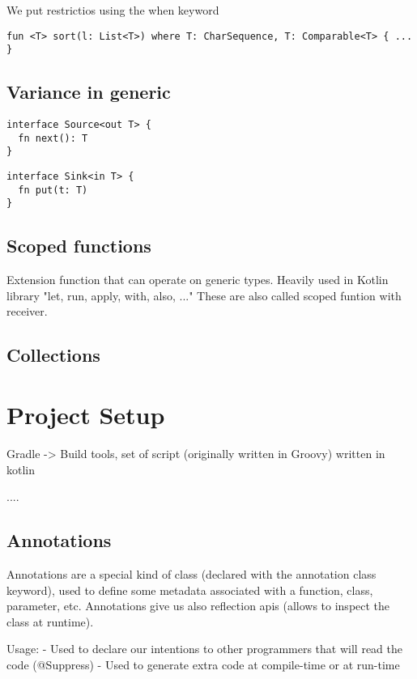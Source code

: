 \documentclass[12pt]{article}
\begin{document}
We put restrictios using the when keyword

\begin{lstlisting}
fun <T> sort(l: List<T>) where T: CharSequence, T: Comparable<T> { ... }
\end{lstlisting}

\subsection{Variance in generic}
\begin{lstlisting}
interface Source<out T> {
  fn next(): T
}
\end{lstlisting}
\begin{lstlisting}
interface Sink<in T> {
  fn put(t: T)
}
\end{lstlisting}

\subsection{Scoped functions}
Extension function that can operate on generic types. Heavily used in Kotlin library "let, run, apply, with, also, ..." These are also called scoped funtion with receiver.


\subsection{Collections}



\section{Project Setup}

Gradle -> Build tools, set of script (originally written in Groovy) written in kotlin

....


\subsection{Annotations}
Annotations are a special kind of class (declared with the annotation class keyword), used to define some metadata associated with a function, class, parameter, etc. Annotations give us also reflection apis (allows to inspect the class at runtime).

Usage:
- Used to declare our intentions to other programmers that will read the code (@Suppress)
- Used to generate extra code at compile-time or at run-time
\end{document}
